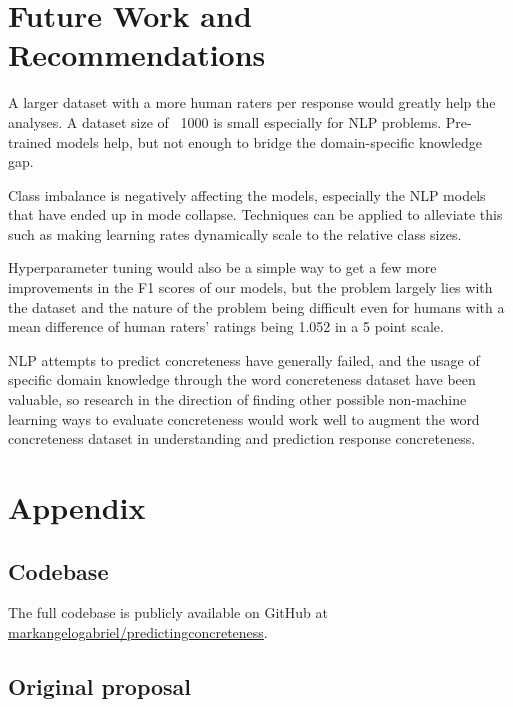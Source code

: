 \documentclass[12pt, a4paper]{article}
\begin{document}
\section{Future Work and Recommendations}
A larger dataset with a more human raters per response would greatly help the analyses. A dataset size of ~1000 is small especially for NLP problems. Pre-trained models help, but not enough to bridge the domain-specific knowledge gap. 

Class imbalance is negatively affecting the models, especially the NLP models that have ended up in mode collapse. Techniques can be applied to alleviate this such as making learning rates dynamically scale to the relative class sizes.

Hyperparameter tuning would also be a simple way to get a few more improvements in the F1 scores of our models, but the problem largely lies with the dataset and the nature of the problem being difficult even for humans with a mean difference of human raters' ratings being 1.052 in a 5 point scale.

NLP attempts to predict concreteness have generally failed, and the usage of specific domain knowledge through the word concreteness dataset have been valuable, so research in the direction of finding other possible non-machine learning ways to evaluate concreteness would work well to augment the word concreteness dataset in understanding and prediction response concreteness.

\clearpage
\section{Appendix}

\subsection{Codebase}
The full codebase is publicly available on GitHub at \underline{\href{https://github.com/markangelogabriel/predictingconcreteness}{markangelogabriel/predictingconcreteness}}.

\subsection{Original proposal}
\end{document}
